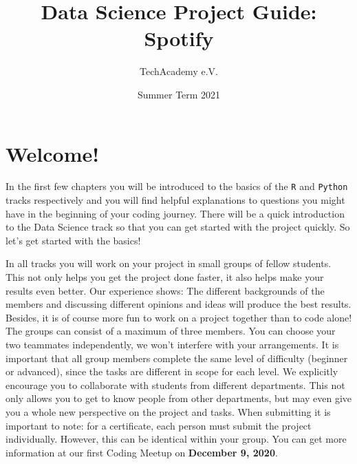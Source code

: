 \documentclass[
  11pt,
]{book}
\title{Data Science Project Guide: Spotify}
\author{TechAcademy e.V.}
\date{Summer Term 2021}
\begin{document}
\maketitle

\clearpage

\addtolength{\headheight}{17.82275pt}

\fancyfoot{}
\fancyfoot[R]{\thepage}
\addtolength{\headheight}{17.82275pt}


\renewcommand{\headrulewidth}{0.25pt}
\renewcommand{\footrulewidth}{0.25pt}

\tableofcontents
\clearpage

\hypertarget{welcome}{%
\chapter{Welcome!}\label{welcome}}

In the first few chapters you will be introduced to the basics of the \texttt{R} and \texttt{Python} tracks respectively and you will find helpful explanations to questions you might have in the beginning of your coding journey. There will be a quick introduction to the Data Science track so that you can get started with the project quickly. So let's get started with the basics!

In all tracks you will work on your project in small groups of fellow students. This not only helps you get the project done faster, it also helps make your results even better. Our experience shows: The different backgrounds of the members and discussing different opinions and ideas will produce the best results. Besides, it is of course more fun to work on a project together than to code alone!\\
The groups can consist of a maximum of three members. You can choose your two teammates independently, we won't interfere with your arrangements. It is important that all group members complete the same level of difficulty (beginner or advanced), since the tasks are different in scope for each level. We explicitly encourage you to collaborate with students from different departments. This not only allows you to get to know people from other departments, but may even give you a whole new perspective on the project and tasks.
When submitting it is important to note: for a certificate, each person must submit the project individually. However, this can be identical within your group. You can get more information at our first Coding Meetup on \textbf{December 9, 2020}.
\end{document}
